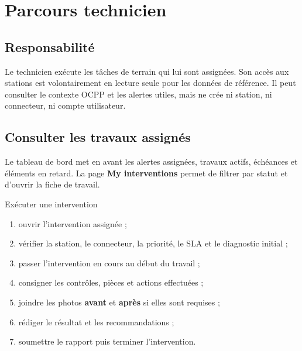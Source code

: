 \chapter{Parcours technicien}

\section{Responsabilité}

Le technicien exécute les tâches de terrain qui lui sont assignées. Son accès aux
stations est volontairement en lecture seule pour les données de référence. Il
peut consulter le contexte OCPP et les alertes utiles, mais ne crée ni station,
ni connecteur, ni compte utilisateur.


\section{Consulter les travaux assignés}

Le tableau de bord met en avant les alertes assignées, travaux actifs, échéances
et éléments en retard. La page \textbf{My interventions} permet de filtrer par
statut et d'ouvrir la fiche de travail.


\begin{procedurebox}{Exécuter une intervention}
  \begin{enumerate}[leftmargin=1.6em]
    \item ouvrir l'intervention assignée ;
    \item vérifier la station, le connecteur, la priorité, le SLA et le
    diagnostic initial ;
    \item passer l'intervention en cours au début du travail ;
    \item consigner les contrôles, pièces et actions effectuées ;
    \item joindre les photos \textbf{avant} et \textbf{après} si elles sont
    requises ;
    \item rédiger le résultat et les recommandations ;
    \item soumettre le rapport puis terminer l'intervention.
  \end{enumerate}
\end{procedurebox}

